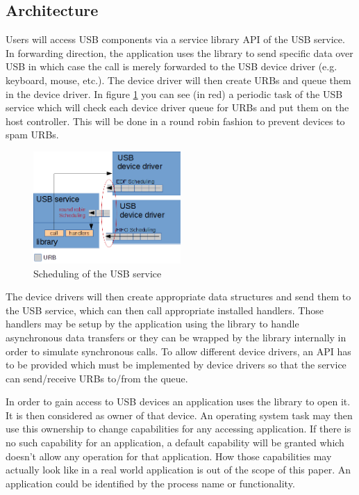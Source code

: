 \documentclass{acm_proc_article-sp}
\begin{document}
\subsection{Architecture}
Users will access USB components via a service library API of the USB service.
In forwarding direction, the application uses the library to send specific data
over USB in which case the call is merely forwarded to the USB device driver
(e.g. keyboard, mouse, etc.).
The device driver will then create URBs and queue them in the device driver.
In figure \ref{fig:usbsched} you can see (in red) a periodic task of the USB service
which will check each device driver queue for URBs and put them on the host controller.
This will be done in a round robin fashion to prevent devices to spam URBs.
\begin{figure}[!h]
\centering
\includegraphics[width=0.5\textwidth]{usbsched.png}
\caption{Scheduling of the USB service}
\label{fig:usbsched}
\end{figure}
The device drivers will then create appropriate data structures and send them
to the USB service, which can then call appropriate installed handlers.
Those handlers may be setup by the application using the library to handle
asynchronous data transfers or they can be wrapped by the library internally
in order to simulate synchronous calls.
To allow different device drivers, an API has to be provided which must be implemented
by device drivers so that the service can send/receive URBs to/from the queue.

In order to gain access to USB devices an application uses the library
to open it.
It is then considered as owner of that device.
An operating system task may then use this ownership to change capabilities
for any accessing application.
If there is no such capability for an application, a default capability will
be granted which doesn't allow any operation for that application.
How those capabilities may actually look like in a real world application
is out of the scope of this paper.
An application could be identified by the process name or functionality.
\end{document}
